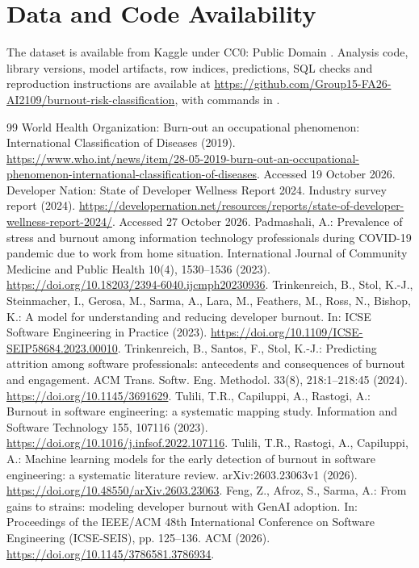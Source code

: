 \documentclass[runningheads]{llncs}
\begin{document}
\section*{Data and Code Availability}
The dataset is available from Kaggle under CC0: Public Domain \cite{dataset}. Analysis code, library versions, model artifacts, row indices, predictions, SQL checks and reproduction instructions are available at \url{https://github.com/Group15-FA26-AI2109/burnout-risk-classification}, with commands in .


\begin{thebibliography}{99}
 World Health Organization: Burn-out an occupational phenomenon: International Classification of Diseases (2019). \url{https://www.who.int/news/item/28-05-2019-burn-out-an-occupational-phenomenon-international-classification-of-diseases}. Accessed 19 October 2026.
 Developer Nation: State of Developer Wellness Report 2024. Industry survey report (2024). \url{https://developernation.net/resources/reports/state-of-developer-wellness-report-2024/}. Accessed 27 October 2026.
 Padmashali, A.: Prevalence of stress and burnout among information technology professionals during COVID-19 pandemic due to work from home situation. International Journal of Community Medicine and Public Health 10(4), 1530--1536 (2023). \url{https://doi.org/10.18203/2394-6040.ijcmph20230936}.
 Trinkenreich, B., Stol, K.-J., Steinmacher, I., Gerosa, M., Sarma, A., Lara, M., Feathers, M., Ross, N., Bishop, K.: A model for understanding and reducing developer burnout. In: ICSE Software Engineering in Practice (2023). \url{https://doi.org/10.1109/ICSE-SEIP58684.2023.00010}.
 Trinkenreich, B., Santos, F., Stol, K.-J.: Predicting attrition among software professionals: antecedents and consequences of burnout and engagement. ACM Trans. Softw. Eng. Methodol. 33(8), 218:1--218:45 (2024). \url{https://doi.org/10.1145/3691629}.
 Tulili, T.R., Capiluppi, A., Rastogi, A.: Burnout in software engineering: a systematic mapping study. Information and Software Technology 155, 107116 (2023). \url{https://doi.org/10.1016/j.infsof.2022.107116}.
 Tulili, T.R., Rastogi, A., Capiluppi, A.: Machine learning models for the early detection of burnout in software engineering: a systematic literature review. arXiv:2603.23063v1 (2026). \url{https://doi.org/10.48550/arXiv.2603.23063}.
 Feng, Z., Afroz, S., Sarma, A.: From gains to strains: modeling developer burnout with GenAI adoption. In: Proceedings of the IEEE/ACM 48th International Conference on Software Engineering (ICSE-SEIS), pp. 125--136. ACM (2026). \url{https://doi.org/10.1145/3786581.3786934}.

\end{thebibliography}
\end{document}
